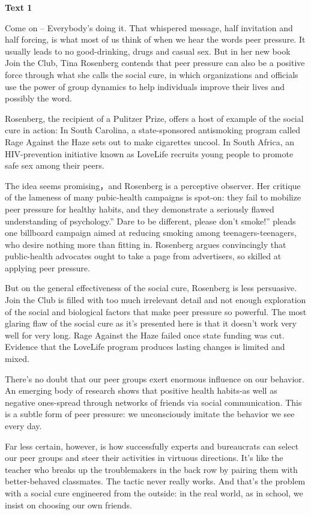 \begin{center}\textbf{Text 1}\end{center}

Come on -- Everybody’s doing it. That whispered message, half invitation and half forcing, is what most of us think of when we hear the words peer pressure. It usually leads to no good-drinking, drugs and casual sex. 
But in her new book Join the Club, Tina Rosenberg contends that peer pressure 
can also be a positive force through what she calls the social cure, in which organizations and officials use the power of group dynamics to help individuals improve their lives and possibly the word.

Rosenberg, the recipient of a Pulitzer Prize, offers a host of example of the social cure in action: In South Carolina, a state-sponsored antismoking program called Rage Against the Haze sets out to make cigarettes uncool. In South Africa, an HIV-prevention initiative known as LoveLife recruits young people to promote safe sex among their peers.

The idea seems promising，and Rosenberg is a perceptive observer. Her critique of the lameness of many pubic-health campaigns is spot-on: they fail to mobilize peer pressure for healthy habits, and they demonstrate a seriously flawed understanding of psychology.” Dare to be different, please don’t smoke!” pleads one billboard campaign aimed at reducing smoking among teenagers-teenagers, who desire nothing more than fitting in. Rosenberg argues convincingly that public-health advocates ought to take a page from advertisers, so skilled at applying peer pressure.

But on the general effectiveness of the social cure, Rosenberg is less persuasive. Join the Club is filled with too much irrelevant detail and not enough exploration of the social and biological factors that make peer pressure so powerful. The most glaring flaw of the social cure as it’s presented here is that it doesn’t work very well for very long. Rage Against the Haze failed once state funding was cut. Evidence that the LoveLife program produces lasting changes is limited and mixed.

There’s no doubt that our peer groups exert enormous influence on our behavior. An emerging body of research shows that positive health habits-as well as negative ones-spread through networks of friends via social communication. This is a subtle form of peer pressure: we unconsciously imitate the behavior we see every day.

Far less certain, however, is how successfully experts and bureaucrats can select our peer groups and steer their activities in virtuous directions. It’s like the teacher who breaks up the troublemakers in the back row by pairing them with better-behaved classmates. The tactic never really works. And that’s the problem with a social cure engineered from the outside: in the real world, as in school, we insist on choosing our own friends.

